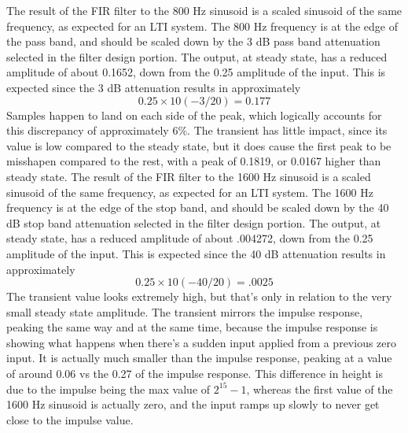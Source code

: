 \documentclass{bannerReport}
\begin{document}
The result of the FIR filter to the 800 Hz sinusoid is a scaled sinusoid of the same frequency, as expected for an LTI system. The 800 Hz frequency is at the edge of the pass band, and should be scaled down by the 3 dB pass band attenuation selected in the filter design portion. The output, at steady state, has a reduced amplitude of about 0.1652, down from the 0.25 amplitude of the input. This is expected since the 3 dB attenuation results in approximately $$0.25\times10(-3/20) = 0.177$$ Samples happen to land on each side of the peak, which logically accounts for this discrepancy of approximately 6\%. The transient has little impact, since its value is low compared to the steady state, but it does cause the first peak to be misshapen compared to the rest, with a peak of 0.1819, or 0.0167 higher than steady state. 
The result of the FIR filter to the 1600 Hz sinusoid is a scaled sinusoid of the same frequency, as expected for an LTI system. The 1600 Hz frequency is at the edge of the stop band, and should be scaled down by the 40 dB stop band attenuation selected in the filter design portion. The output, at steady state, has a reduced amplitude of about .004272, down from the 0.25 amplitude of the input. This is expected since the 40 dB attenuation results in approximately $$0.25\times10(-40/20) = .0025$$ The transient value looks extremely high, but that’s only in relation to the very small steady state amplitude. The transient mirrors the impulse response, peaking the same way and at the same time, because the impulse response is showing what happens when there’s a sudden input applied from a previous zero input. It is actually  much smaller than the impulse response, peaking at a value of around 0.06 vs the 0.27 of the impulse response. This difference in height is due to the impulse being the max value of $2^{15}-1$, whereas the first value of the 1600 Hz sinusoid is actually zero, and the input ramps up slowly to never get close to the impulse value.
\end{document}
